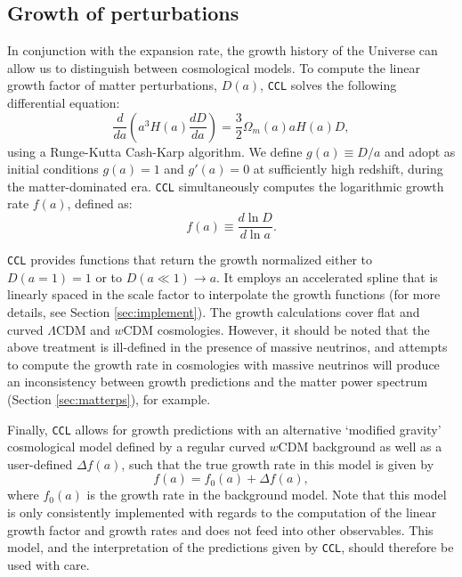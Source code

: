 \documentclass[\docopts]{\docclass}
\newcommand{\ccl}{{\tt CCL}\xspace}
\begin{document}
\subsection{Growth of perturbations}
\label{sec:growth}

In conjunction with the expansion rate, the growth history of the Universe can allow us to distinguish between cosmological models. To compute the linear growth factor of matter perturbations, $D(a)$, \ccl solves the following differential equation:
\begin{equation}
  \frac{d}{da}\left(a^3H(a)\frac{dD}{da}\right)=\frac{3}{2}\Omega_m(a)aH(a)D,
  \label{eq:growth}
\end{equation}
using a Runge-Kutta Cash-Karp algorithm. We define $g(a)\equiv D/a$ and adopt as initial conditions $g(a)=1$ and $g'(a)=0$ at sufficiently high redshift, during the matter-dominated era. \ccl simultaneously computes the logarithmic growth rate $f(a)$, defined as:
\begin{equation}
  f(a)\equiv \frac{d\ln D}{d\ln a}.
  \label{eq:lingrowthf}
\end{equation}

\ccl provides functions that return the growth normalized either to $D(a=1)=1$ or to $D(a\ll1)\rightarrow a$. It employs an accelerated spline that is linearly spaced in the scale factor to interpolate the growth functions (for more details, see Section \ref{sec:implement}). The growth calculations cover flat and curved $\Lambda$CDM and $w$CDM cosmologies. However, it should be noted that the above treatment is ill-defined in the presence of massive neutrinos, and attempts to compute the growth rate in cosmologies with massive neutrinos will produce an inconsistency between growth predictions and the matter power spectrum (Section \ref{sec:matterps}), for example.

Finally, \ccl allows for growth predictions with an alternative `modified gravity' cosmological model defined by a regular curved $w$CDM background as well as a user-defined $\Delta f(a)$, such that the true growth rate in this model is given by
\begin{equation}
  f(a)=f_0(a)+\Delta f(a),
\label{eq:mgrowth}
\end{equation}
where $f_0(a)$ is the growth rate in the background model. Note that this model is only consistently implemented with regards to the computation of the linear growth factor and growth rates and does not feed into other observables. This model, and the interpretation of the predictions given by \ccl, should therefore be used with care. 
\end{document}

